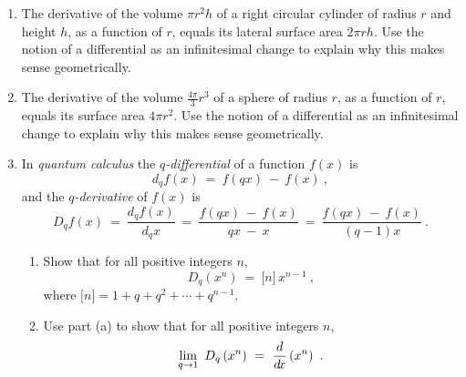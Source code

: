 {\begin{enumerate}[item-label={\bfseries \arabic*.}]
\begin{enumerate}[item-label={\bfseries (\alph*)}]
   \item One of the \emph{fundamental property relations} for an ideal gas
    (which you do not need to prove) is
    \begin{displaymath}
     dG ~=~ V\,\dP ~-~ S\,\dT ~.
    \end{displaymath}
    Use this and part (a) to show that
   \begin{displaymath}
    d\left(\dfrac{G}{RT}\right) ~=~ \dfrac{V}{RT}\,\dP ~-~ \dfrac{H}{RT^2}\,\dT ~.
   \end{displaymath}
  \end{enumerate}
 \item The derivative of the volume $\pi r^2 h$ of a right circular cylinder of
  radius $r$ and height $h$, as a function of $r$, equals its lateral surface
  area $2\pi r h$. Use the notion of a differential as an infinitesimal change
  to explain why this makes sense geometrically.
 \item The derivative of the volume $\frac{4\pi}{3}r^3$ of a sphere of radius
  $r$, as a function of $r$, equals its surface area $4\pi r^2$. Use the notion
  of a differential as an infinitesimal change to explain why this makes sense
  geometrically.
 \item In \emph{quantum calculus} the
  \emph{$q$-differential} of a function
   $f(x)$ is
\[
d_qf(x) ~=~ f(qx) ~-~ f(x) ~,
\]
and the \emph{$q$-derivative} of $f(x)$ is
\[
D_qf(x) ~=~ \frac{d_qf(x)}{d_qx} ~=~ \frac{f(qx) ~-~ f(x)}{qx ~-~ x} ~=~
\frac{f(qx) ~-~ f(x)}{(q - 1)x} ~.
\]
\begin{enumerate}[item-label={\bfseries (\alph*)}]
 \item Show that for all positive integers $n$,
\[
D_q\left(x^n\right) ~=~ \lbrack n \rbrack\, x^{n-1} ~,
\]
where $\lbrack n \rbrack = 1 + q + q^2 + \cdots + q^{n-1}$.
 \item Use part (a) to show that for all positive integers $n$,
\[
\lim_{q \to 1}~D_q\left(x^n\right) ~=~ \frac{d}{d\!x}\left(x^n\right) ~.
\]
\end{enumerate}
\end{enumerate}
}
